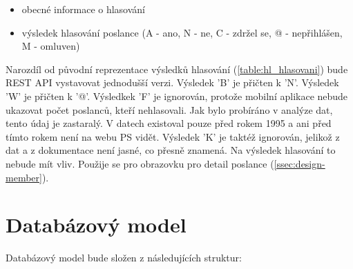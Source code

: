 \begin{itemize}
\item obecné informace o hlasování
\item výsledek hlasování poslance (A - ano, N - ne, C - zdržel se, @ - nepřihlášen, M - omluven)
\end{itemize}

\noindent Narozdíl od původní reprezentace výsledků hlasování (\ref{table:hl_hlasovani}) bude REST API vystavovat jednodušší verzi. Výsledek 'B' je přičten k 'N'. Výsledek 'W' je přičten k '@'. Výsledkek 'F' je \linebreak ignorován, protože mobilní aplikace nebude ukazovat počet poslanců, kteří nehlasovali. Jak bylo probíráno v analýze dat, tento údaj je zastaralý. V datech existoval pouze před rokem 1995 \linebreak a ani před tímto rokem není na webu PS vidět. Výsledek 'K' je taktéž ignorován, jelikož z dat \linebreak a z dokumentace není jasné, co přesně znamená. Na výsledek hlasování to nebude mít vliv. Použije se pro obrazovku pro detail poslance (\ref{ssec:design-member}).

\section{Databázový model}
\label{sec:database_model}

Databázový model bude složen z následujících struktur:

